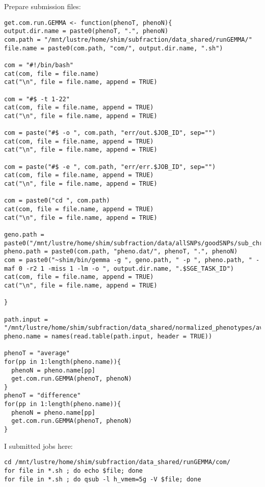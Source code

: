 \documentclass[11pt]{article}
\begin{document}
Prepare submission files:
\begin{lstlisting}
get.com.run.GEMMA <- function(phenoT, phenoN){
output.dir.name = paste0(phenoT, ".", phenoN)
com.path = "/mnt/lustre/home/shim/subfraction/data_shared/runGEMMA/"
file.name = paste0(com.path, "com/", output.dir.name, ".sh")

com = "#!/bin/bash"
cat(com, file = file.name)
cat("\n", file = file.name, append = TRUE)

com = "#$ -t 1-22"
cat(com, file = file.name, append = TRUE)
cat("\n", file = file.name, append = TRUE)	

com = paste("#$ -o ", com.path, "err/out.$JOB_ID", sep="")
cat(com, file = file.name, append = TRUE)
cat("\n", file = file.name, append = TRUE)	

com = paste("#$ -e ", com.path, "err/err.$JOB_ID", sep="")
cat(com, file = file.name, append = TRUE)
cat("\n", file = file.name, append = TRUE)	

com = paste0("cd ", com.path)
cat(com, file = file.name, append = TRUE)
cat("\n", file = file.name, append = TRUE)

geno.path = paste0("/mnt/lustre/home/shim/subfraction/data/allSNPs/goodSNPs/sub_chr$SGE_TASK_ID.geno")
pheno.path = paste0(com.path, "pheno.dat/", phenoT, ".", phenoN)
com = paste0("~shim/bin/gemma -g ", geno.path, " -p ", pheno.path, " -maf 0 -r2 1 -miss 1 -lm -o ", output.dir.name, ".$SGE_TASK_ID")
cat(com, file = file.name, append = TRUE)
cat("\n", file = file.name, append = TRUE)

}

path.input = "/mnt/lustre/home/shim/subfraction/data_shared/normalized_phenotypes/average.txt"
pheno.name = names(read.table(path.input, header = TRUE))

phenoT = "average"
for(pp in 1:length(pheno.name)){
  phenoN = pheno.name[pp]
  get.com.run.GEMMA(phenoT, phenoN)
}
phenoT = "difference"
for(pp in 1:length(pheno.name)){
  phenoN = pheno.name[pp]
  get.com.run.GEMMA(phenoT, phenoN)
}
\end{lstlisting}

I submitted jobs here:
\begin{lstlisting}
cd /mnt/lustre/home/shim/subfraction/data_shared/runGEMMA/com/
for file in *.sh ; do echo $file; done
for file in *.sh ; do qsub -l h_vmem=5g -V $file; done
\end{lstlisting}
\end{document}
